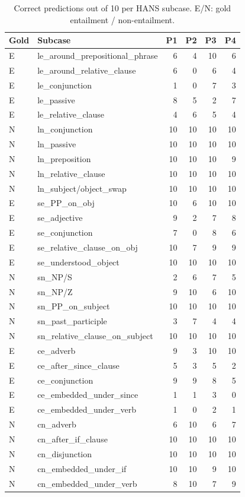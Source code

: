 \begin{table}[t]
\centering
\scriptsize
\begin{tabular}{llrrrr}
\toprule
Gold & Subcase & P1 & P2 & P3 & P4 \\
\midrule
E & le\_around\_prepositional\_phrase & 6 & 4 & 10 & 6 \\
E & le\_around\_relative\_clause & 6 & 0 & 6 & 4 \\
E & le\_conjunction & 1 & 0 & 7 & 3 \\
E & le\_passive & 8 & 5 & 2 & 7 \\
E & le\_relative\_clause & 4 & 6 & 5 & 4 \\
N & ln\_conjunction & 10 & 10 & 10 & 10 \\
N & ln\_passive & 10 & 10 & 10 & 10 \\
N & ln\_preposition & 10 & 10 & 10 & 9 \\
N & ln\_relative\_clause & 10 & 10 & 10 & 10 \\
N & ln\_subject/object\_swap & 10 & 10 & 10 & 10 \\
\midrule
E & se\_PP\_on\_obj & 10 & 6 & 10 & 10 \\
E & se\_adjective & 9 & 2 & 7 & 8 \\
E & se\_conjunction & 7 & 0 & 8 & 6 \\
E & se\_relative\_clause\_on\_obj & 10 & 7 & 9 & 9 \\
E & se\_understood\_object & 10 & 10 & 10 & 10 \\
N & sn\_NP/S & 2 & 6 & 7 & 5 \\
N & sn\_NP/Z & 9 & 10 & 6 & 10 \\
N & sn\_PP\_on\_subject & 10 & 10 & 10 & 10 \\
N & sn\_past\_participle & 3 & 7 & 4 & 4 \\
N & sn\_relative\_clause\_on\_subject & 10 & 10 & 10 & 10 \\
\midrule
E & ce\_adverb & 9 & 3 & 10 & 10 \\
E & ce\_after\_since\_clause & 5 & 3 & 5 & 2 \\
E & ce\_conjunction & 9 & 9 & 8 & 5 \\
E & ce\_embedded\_under\_since & 1 & 1 & 3 & 0 \\
E & ce\_embedded\_under\_verb & 1 & 0 & 2 & 1 \\
N & cn\_adverb & 6 & 10 & 6 & 7 \\
N & cn\_after\_if\_clause & 10 & 10 & 10 & 10 \\
N & cn\_disjunction & 10 & 10 & 10 & 10 \\
N & cn\_embedded\_under\_if & 10 & 10 & 9 & 10 \\
N & cn\_embedded\_under\_verb & 8 & 10 & 7 & 9 \\
\bottomrule
\end{tabular}
\caption{Correct predictions out of 10 per HANS subcase. E/N: gold entailment / non-entailment.}
\label{tab:subcase}
\end{table}
